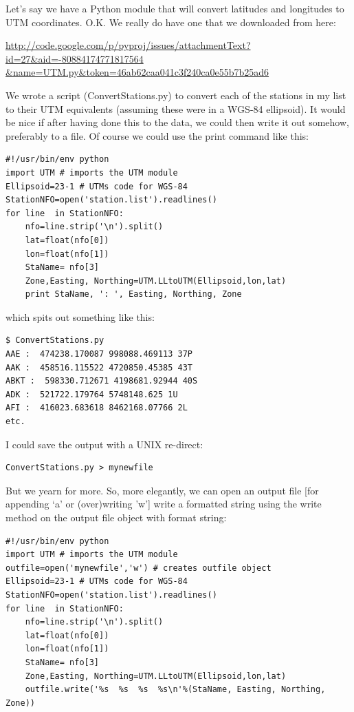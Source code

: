 \documentclass[11pt]{book}
\begin{document}
{{Let's say we  have a Python module that will convert latitudes and longitudes to UTM coordinates.  O.K. We really do have one that we downloaded from here:

\url{http://code.google.com/p/pyproj/issues/attachmentText?id=27\&aid=-80884174771817564 \&name=UTM.py\&token=46ab62caa041c3f240ca0e55b7b25ad6}

\noindent We wrote a script ({\color{blue}ConvertStations.py}) to convert each of the stations in my list to their UTM equivalents (assuming these were in a WGS-84 ellipsoid).  It would be nice if  after having done this to the data, we could then write it out somehow, preferably to a file.  Of course we could use the {\color{blue}print} command like this:


 { \color{blue} \begin{verbatim}
#!/usr/bin/env python
import UTM # imports the UTM module
Ellipsoid=23-1 # UTMs code for WGS-84
StationNFO=open('station.list').readlines()
for line  in StationNFO:
    nfo=line.strip('\n').split()
    lat=float(nfo[0])
    lon=float(nfo[1])
    StaName= nfo[3]
    Zone,Easting, Northing=UTM.LLtoUTM(Ellipsoid,lon,lat)
    print StaName, ': ', Easting, Northing, Zone
 \end{verbatim}}

\noindent
which spits out something like this:

{ \color{blue} \begin{verbatim}
$ ConvertStations.py
AAE :  474238.170087 998088.469113 37P
AAK :  458516.115522 4720850.45385 43T
ABKT :  598330.712671 4198681.92944 40S
ADK :  521722.179764 5748148.625 1U
AFI :  416023.683618 8462168.07766 2L
etc.
\end{verbatim}}

\noindent
I could save the output with a UNIX re-direct:
 { \color{blue} \begin{verbatim}
ConvertStations.py > mynewfile
 \end{verbatim}}

But we yearn for more.  So,  more  elegantly, we can open an output file [for appending `a' or (over)writing 'w']  write a formatted string using the write method on  the output file object with format string:

 { \color{blue} \begin{verbatim}
#!/usr/bin/env python
import UTM # imports the UTM module
outfile=open('mynewfile','w') # creates outfile object
Ellipsoid=23-1 # UTMs code for WGS-84
StationNFO=open('station.list').readlines()
for line  in StationNFO:
    nfo=line.strip('\n').split()
    lat=float(nfo[0])
    lon=float(nfo[1])
    StaName= nfo[3]
    Zone,Easting, Northing=UTM.LLtoUTM(Ellipsoid,lon,lat)
    outfile.write('%s  %s  %s  %s\n'%(StaName, Easting, Northing, Zone))
\end{verbatim}}

}}
\end{document}
